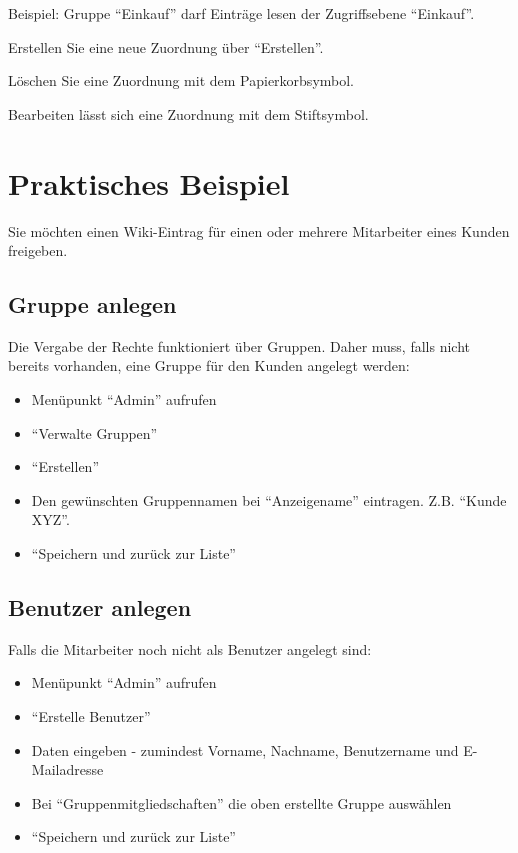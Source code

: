 \documentclass[article, a4paper, oneside, 11pt]{memoir}
\begin{document}
Beispiel: Gruppe "`Einkauf"' darf Einträge lesen der Zugriffsebene "`Einkauf"'.

Erstellen Sie eine neue Zuordnung über "`Erstellen"'.

Löschen Sie eine Zuordnung mit dem Papierkorbsymbol.

Bearbeiten lässt sich eine Zuordnung mit dem Stiftsymbol.


\section{Praktisches Beispiel}

Sie möchten einen Wiki-Eintrag für einen oder mehrere Mitarbeiter eines Kunden freigeben.

\subsection{Gruppe anlegen}
Die Vergabe der Rechte funktioniert über Gruppen. Daher muss, falls nicht bereits vorhanden, eine Gruppe für den Kunden angelegt werden:

\begin{itemize}
\item Menüpunkt "`Admin"' aufrufen
\item "`Verwalte Gruppen"'
\item "`Erstellen"'
\item Den gewünschten Gruppennamen bei "`Anzeigename"' eintragen. Z.B. "`Kunde XYZ"'.
\item "`Speichern und zurück zur Liste"'
\end{itemize}

\subsection{Benutzer anlegen}
Falls die Mitarbeiter noch nicht als Benutzer angelegt sind:

\begin{itemize}
\item Menüpunkt "`Admin"' aufrufen
\item "`Erstelle Benutzer"'
\item Daten eingeben - zumindest Vorname, Nachname, Benutzername und E-Mailadresse
\item Bei "`Gruppenmitgliedschaften"' die oben erstellte Gruppe auswählen
\item "`Speichern und zurück zur Liste"'
\end{itemize}
\end{document}
